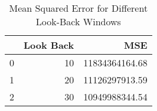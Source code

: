 \begin{table}
    \caption{Mean Squared Error for Different Look-Back Windows}
    \label{tab:mse_results}
    \begin{tabular}{lrr}
        \toprule
        & Look Back & MSE \\
        \midrule
        0 & 10 & 11834364164.68 \\
        1 & 20 & 11126297913.59 \\
        2 & 30 & 10949988344.54 \\
        \bottomrule
    \end{tabular}
\end{table}
